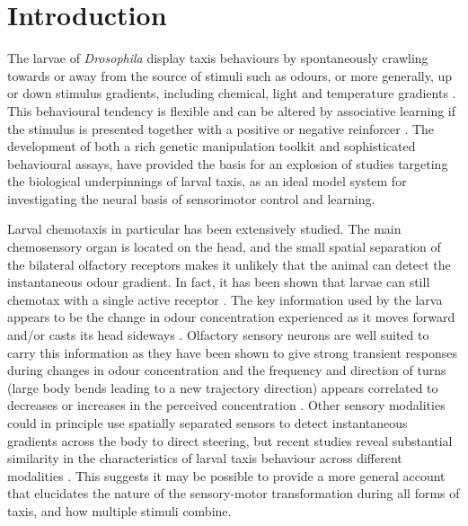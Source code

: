 \documentclass[11pt,a4paper]{article}
\newcommand{\Dros }{\emph{Drosophila }}
\newcommand{\todoBW}[1]{\todo[author=BW,color=orange, size=\tiny,inline]{#1}}
\begin{document}
\section{Introduction}
The larvae of \Dros display taxis behaviours by spontaneously crawling towards or away from the source of stimuli such as odours, or more generally, up or down stimulus gradients, including chemical, light and temperature gradients \citep{luo2010navigational,gomez2011active,gomez2012active,gomez2014multilevel,kane2013sensorimotor,klein2015sensory}. This behavioural tendency is flexible and can be altered by associative learning if the stimulus is presented together with a positive or negative reinforcer \citep{ache2005olfaction,scherer2003olfactory,gerber2004engram,diegelmann2013maggot,schleyer2015learning}. The development of both a rich genetic manipulation toolkit and sophisticated behavioural assays, \citep{gerber2009smelling,diegelmann2013maggot} 
\todoBW{additional citations needed} 
have provided the basis for an explosion of studies targeting the biological underpinnings of larval taxis, as an ideal model system for investigating the neural basis of sensorimotor control and learning.

Larval chemotaxis in particular has been extensively studied. The main chemosensory organ is located on the head, and the small spatial separation of the bilateral olfactory receptors makes it unlikely that the animal can detect the instantaneous odour gradient. In fact, it has been shown that larvae can still chemotax with a single active receptor  \citep{fishilevich2005chemotaxis,gomez2010mechanisms,louis2008bilateral}. The key information used by the larva  appears to be the change in odour concentration experienced as it moves forward and/or casts its head sideways \citep{gomez2010mechanisms}. 
Olfactory sensory neurons are well suited to carry this information as they have been shown to give strong transient responses during changes in odour concentration \citep{de2013common,nagel2011biophysical,kim2011system,schulze2015dynamical} and the frequency and direction of turns (large body bends leading to a new trajectory direction) appears correlated to  decreases or increases in the perceived concentration \citep{hernandez2015reverse,schulze2015dynamical}. 
  Other sensory modalities could in principle use spatially separated sensors to detect instantaneous gradients across the body to direct steering, but recent studies reveal substantial similarity in the characteristics of larval taxis behaviour across different modalities \citep{gepner2015computations, bellmann2010optogenetically, lahiri2011two}. This suggests it may be possible to provide a more general account that elucidates the nature of the sensory-motor transformation during all forms of taxis, and how multiple stimuli combine. 
\end{document}
